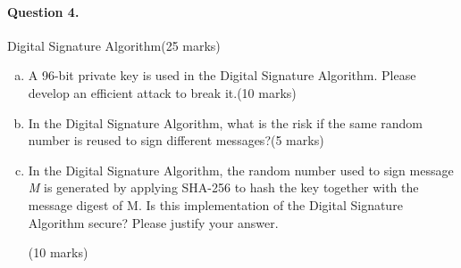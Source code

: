 \documentclass[12pt]{article}
\begin{document}
\newpage
\paragraph{Question 4.}   Digital Signature Algorithm\hfill (25 marks)
\begin{enumerate}[(a)]
    \item A 96-bit private key is used in the Digital Signature Algorithm. Please develop an efficient attack to break it.\hfill (10 marks)
    \item In the Digital Signature Algorithm, what is the risk if the same random number is reused to sign different messages?\hfill (5 marks)
    \item In the Digital Signature Algorithm, the random number used to sign message \textit{M} is generated by applying SHA-256 to hash the key together with the message digest of M. Is this implementation of the Digital Signature Algorithm secure? Please justify your answer.{\vspace{-2.1em}\begin{flushright} (10 marks)\end{flushright}}
\end{enumerate}
\end{document}

